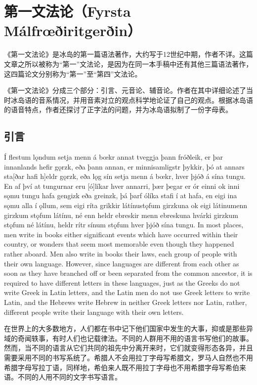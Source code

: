 \chapter{第一文法论（Fyrsta Málfrœðiritgerðin）}

《第一文法论》是冰岛的第一篇语法著作，大约写于12世纪中期，作者不详。这篇文章之所以被称为“第一”文法论，是因为在同一本手稿中还有其他三篇语法著作，这四篇论文分别称为“第一”至“第四”文法论。

《第一文法论》分成三个部分：引言\footnotemark、元音论、辅音论。作者在其中详细论述了当时冰岛语的音系情况，并用音素对立的观点科学地论证了自己的观点。根据冰岛语的语音特点，作者还探讨了正字法的问题，并为冰岛语拟制了一份字母表。
\section{引言}
\begin{paracol}{2}
    Í flestum lǫndum setja menn á bœkr annat tveggja þann fróðleik, er þar innanlands hefir gǫrzk, eða þann annan, er minnisamligstr þykkir, þó at annars sta[ðar hafi h]eldr gǫrzk, eða lǫg sín setja menn á bœkr, hver þjóð á sína tungu. En af því at tungurnar eru [ó]líkar hver annarri, þær þegar er ór einni ok inni sǫmu tungu hafa gengizk eða greinzk, þá þarf ólíka stafi í at hafa, en eigi ina sǫmu alla í ǫllum, sem eigi ríta grikkir látínustǫfum girzkuna ok eigi látinumenn girzkum stǫfum látínu, né enn heldr ebreskir menn ebreskuna hvárki girzkum stǫfum né látínu, heldr rítr sínum stǫfum hver þjóð sína tungu.
    \switchcolumn
    In most places, men write in books either significant events which have occurred within their country, or wonders that seem most memorable even though they happened rather aboard. Men also write in books their laws, each group of people with their own language. However, since languages are different from each other as soon as they have branched off or been separated from the common ancestor, it is required to have different letters in these languages, just as the Greeks do not write Greek in Latin letters, and the Latin men do not use Greek letters to write Latin, and the Hebrews write Hebrew in neither Greek letters nor Latin, rather, different people write their language with their own letters.
\end{paracol}
\begin{translation*}{}
    在世界上的大多数地方，人们都在书中记下他们国家中发生的大事，抑或是那些异域的奇闻轶事，有时人们也记载律法。不同的人群用不用的语言书写他们的故事。然而，当不同的语言从它们共同的祖先中分离开来时，它们就变得形态各异，并且需要采用不同的书写系统了。希腊人不会用拉丁字母写希腊文，罗马人自然也不用希腊字母写拉丁语，同样地，希伯来人既不用拉丁字母也不用希腊字母写希伯来语。不同的人用不同的文字书写语言。
\end{translation*}
